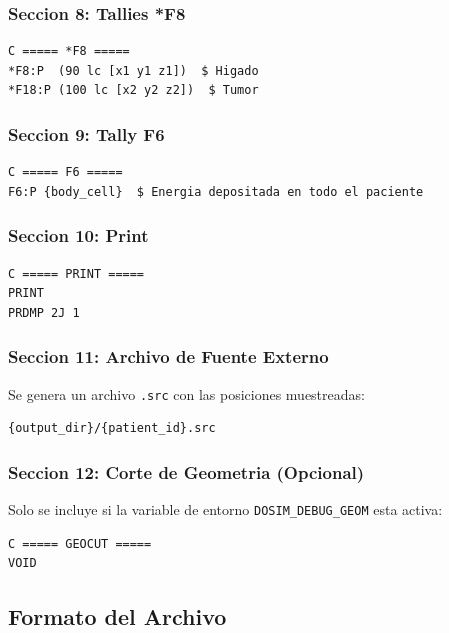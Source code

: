 \documentclass[12pt,a4paper]{article}
\begin{document}
\subsubsection{Seccion 8: Tallies *F8}

\begin{verbatim}
C ===== *F8 =====
*F8:P  (90 lc [x1 y1 z1])  $ Higado
*F18:P (100 lc [x2 y2 z2])  $ Tumor
\end{verbatim}

\subsubsection{Seccion 9: Tally F6}

\begin{verbatim}
C ===== F6 =====
F6:P {body_cell}  $ Energia depositada en todo el paciente
\end{verbatim}

\subsubsection{Seccion 10: Print}

\begin{verbatim}
C ===== PRINT =====
PRINT
PRDMP 2J 1
\end{verbatim}

\subsubsection{Seccion 11: Archivo de Fuente Externo}

Se genera un archivo \texttt{.src} con las posiciones muestreadas:

\begin{verbatim}
{output_dir}/{patient_id}.src
\end{verbatim}

\subsubsection{Seccion 12: Corte de Geometria (Opcional)}

Solo se incluye si la variable de entorno \texttt{DOSIM\_DEBUG\_GEOM} esta activa:

\begin{verbatim}
C ===== GEOCUT =====
VOID
\end{verbatim}

\subsection{Formato del Archivo}
\end{document}
